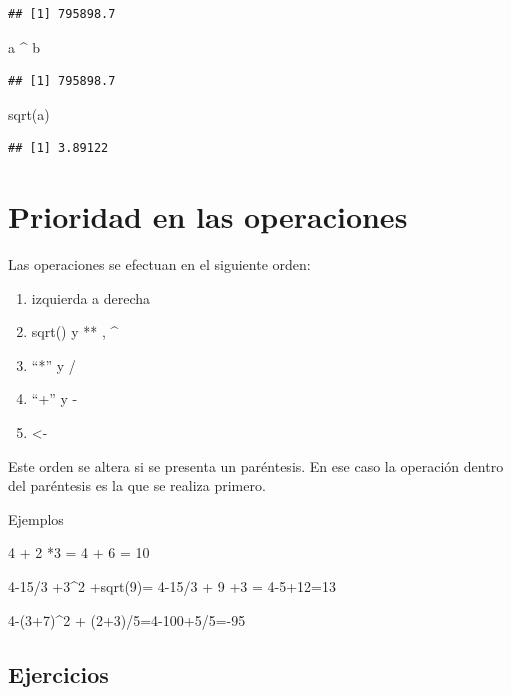\documentclass[
]{book}
\newenvironment{Shaded}{\begin{snugshade}}{\end{snugshade}}
\newcommand{\FunctionTok}[1]{\textcolor[rgb]{0.00,0.00,0.00}{#1}}
\newcommand{\NormalTok}[1]{#1}
\newcommand{\SpecialCharTok}[1]{\textcolor[rgb]{0.00,0.00,0.00}{#1}}
\providecommand{\tightlist}{%
  \setlength{\itemsep}{0pt}\setlength{\parskip}{0pt}}
\begin{document}
\begin{verbatim}
## [1] 795898.7
\end{verbatim}

\begin{Shaded}
\begin{Highlighting}[]
\NormalTok{a }\SpecialCharTok{\^{}}\NormalTok{ b}
\end{Highlighting}
\end{Shaded}

\begin{verbatim}
## [1] 795898.7
\end{verbatim}

\begin{Shaded}
\begin{Highlighting}[]
\FunctionTok{sqrt}\NormalTok{(a)}
\end{Highlighting}
\end{Shaded}

\begin{verbatim}
## [1] 3.89122
\end{verbatim}

\hypertarget{prioridad-en-las-operaciones}{%
\section{Prioridad en las operaciones}\label{prioridad-en-las-operaciones}}

Las operaciones se efectuan en el siguiente orden:

\begin{enumerate}
\def\labelenumi{\arabic{enumi}.}
\tightlist
\item
  izquierda a derecha
\item
  sqrt() y ** , \^{}
\item
  ``*'' y /
\item
  ``+'' y -
\item
  \textless-
\end{enumerate}

Este orden se altera si se presenta un paréntesis. En ese caso la operación dentro del paréntesis es la que se realiza primero.

Ejemplos

4 + 2 *3 = 4 + 6 = 10

4-15/3 +3\^{}2 +sqrt(9)= 4-15/3 + 9 +3 = 4-5+12=13

4-(3+7)\^{}2 + (2+3)/5=4-100+5/5=-95

\hypertarget{ejercicios}{%
\subsection{Ejercicios}\label{ejercicios}}
\end{document}
